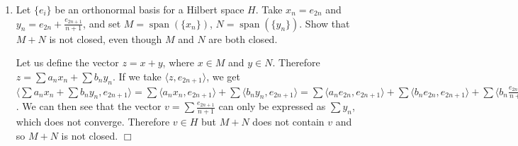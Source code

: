 \documentclass[12pt,letterpaper,reqno]{amsart}
\newcommand{\R}{\mathbb R}
\renewcommand{\span}{\operatorname{span}}
\begin{document}
\begin{enumerate}[1.]
\begin{enumerate}
\begin{flushleft}
Suppose $r _ { n } \rightarrow r > 0 .$ Then there is $N$ such that $r _ { N } \leq 2 r$. Then for all $n \geq N$ we have $r \leq r _ { n } \leq r _ { N } \leq 2 r ,$ so $r _ { N } - r _ { n } \leq r$ and the claim implies that $\left\| x _ { n } - x _ { N } \right\| \leq r \leq r _ { n } ,$ so $x _ { N } \in \bigcap _ { n = 1 } ^ { \infty } B _ { \leq r _ { n } } \left( x _ { n } \right)$. Therefore, $\cap_n B_n$ is nonempty, as desired. $\Box$\newline
\end{flushleft}
\item Give an example of a nested sequence of closed non-empty sets $C_i$ in $\R$ such that $\cap C_i=\emptyset$.\newline
\begin{flushleft}
Each term of the sequence $C_i = [i,\infty)$ is closed and non-empty, yet $\bigcap C_i = \emptyset$. This is because for any number $j \in \R$, the intersection $\bigcap\limits_{i=0}^{j+1} C_i$ will exclude $j$.\newline
\end{flushleft}
\item Give an example of a nested sequence $\{E_n\}$ of nonempty closed bounded convex sets in a Banach space $V$ (of your choice) such that $\cap_n E_n=\emptyset$.\newline
\begin{flushleft}
Consider $c_0$ with the supremum norm, and $E_n = \left\{ x \in c _ { 0 } : \| x \| \leq 1 , \sum _ { k = 1 } ^ { \infty } 2 ^ { - k } x _ { k } \geq 1 - 1 / n \right\}$. This is a nested sequence of nonempty closed convex sets. Yet, $\bigcap E_n$ is empty, since the only element it could conceivably contain, $(1,1,1,\ldots)$ is not in $c_0$.\newline
\end{flushleft}
\end{enumerate}
\newpage
\item Let $\{e_i\}$ be an orthonormal basis for a Hilbert space $H$. Take $x_n=e_{2n}$ and $y_n=e_{2n}+\frac{e_{2n+1}}{n+1}$, and set $M=\span(\{x_n\})$, $N=\span(\{y_n\})$. Show that $M+N$ is not closed, even though $M$ and $N$ are both closed.\newline
\begin{flushleft}
Let us define the vector $z = x + y$, where $x \in M$ and $y \in N$. Therefore $z = \sum a_n x_n + \sum b_n y_n$. If we take $\langle z, e_{2n+1}\rangle$, we get $\langle \sum a_n x_n + \sum b_n y_n, e_{2n+1}\rangle = \sum \langle a_n x_n, e_{2n+1}\rangle + \sum \langle b_n y_n, e_{2n+1}\rangle = \sum \langle a_n e_{2n}, e_{2n+1}\rangle + \sum \langle b_n e_{2n}, e_{2n+1}\rangle + \sum \langle b_n\frac{e_{2n+1}}{n+1}, e_{2n+1}\rangle = \sum \langle b_n\frac{e_{2n+1}}{n+1}, e_{2n+1}\rangle = \frac{b_n}{n+1}$. We can then see that the vector $v = \sum \frac{e_{2n+1}}{n+1}$ can only be expressed as $\sum y_n$, which does not converge. Therefore $v \in H$ but $M + N$ does not contain $v$ and so $M + N$ is not closed. $\Box$

\end{flushleft}
\end{enumerate}
\end{document}
